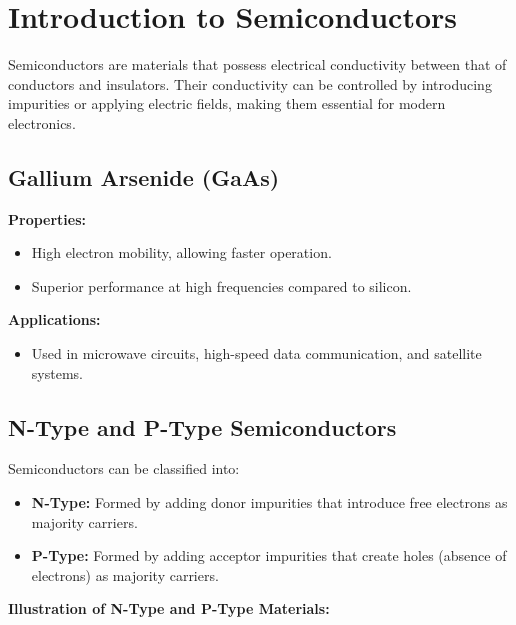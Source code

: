 
\section{Introduction to Semiconductors}
Semiconductors are materials that possess electrical conductivity between that of conductors and insulators. Their conductivity can be controlled by introducing impurities or applying electric fields, making them essential for modern electronics.

\subsection{Gallium Arsenide (GaAs)}
\textbf{Properties:}
\begin{itemize}
    \item High electron mobility, allowing faster operation.
    \item Superior performance at high frequencies compared to silicon.
\end{itemize}

\textbf{Applications:}
\begin{itemize}
    \item Used in microwave circuits, high-speed data communication, and satellite systems.
\end{itemize}

\subsection{N-Type and P-Type Semiconductors}
Semiconductors can be classified into:
\begin{itemize}
    \item \textbf{N-Type:} Formed by adding donor impurities that introduce free electrons as majority carriers.
    \item \textbf{P-Type:} Formed by adding acceptor impurities that create holes (absence of electrons) as majority carriers.
\end{itemize}

\textbf{Illustration of N-Type and P-Type Materials:}

\begin{center}
\end{center}

